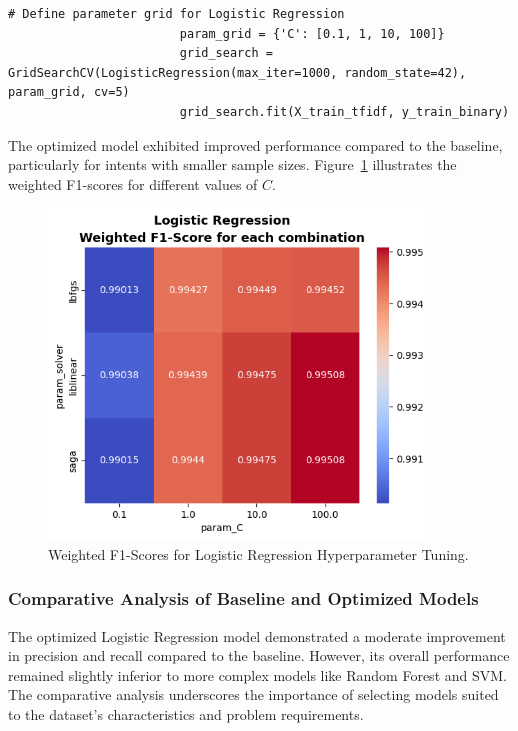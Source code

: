                 \begin{lstlisting}[caption={Parameter grid for Logistic Regression}, label={lst:logistic_param_grid}]
                        # Define parameter grid for Logistic Regression
                        param_grid = {'C': [0.1, 1, 10, 100]}
                        grid_search = GridSearchCV(LogisticRegression(max_iter=1000, random_state=42), param_grid, cv=5)
                        grid_search.fit(X_train_tfidf, y_train_binary)
                \end{lstlisting}

            The optimized model exhibited improved performance compared to the baseline, particularly for intents with smaller sample sizes. Figure~\ref{fig:logistic_tuning} illustrates the weighted F1-scores for different values of \( C \).

            \begin{figure}[H]
                \centering
                \includegraphics[width=0.9\textwidth]{../figures/plots/section2/weighted_f1_score_for_each_combination_of_parameters_logistic_regression.png}
                \caption{Weighted F1-Scores for Logistic Regression Hyperparameter Tuning.}
                \label{fig:logistic_tuning}
            \end{figure}

        \subsubsection{Comparative Analysis of Baseline and Optimized Models \\}

            The optimized Logistic Regression model demonstrated a moderate improvement in precision and recall compared to the baseline. However, its overall performance remained slightly inferior to more complex models like Random Forest and SVM. The comparative analysis underscores the importance of selecting models suited to the dataset's characteristics and problem requirements.
